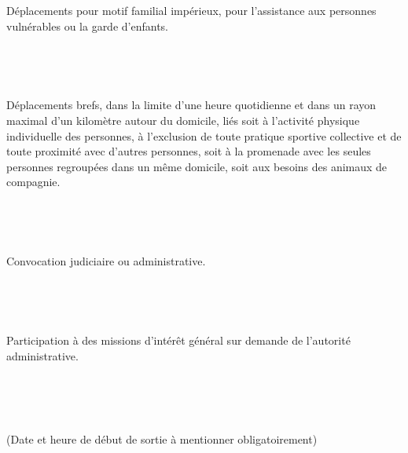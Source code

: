 \documentclass[a4paper,pagesize=pdftex,DIV=16]{scrartcl}
\newlength\TextFieldLength
\newcommand\TextFieldFill[2][]{%
	\setlength\TextFieldLength{\linewidth}%
	\settowidth{\dimen0}{#2 }%
	\addtolength\TextFieldLength{-\dimen0}%
	\addtolength\TextFieldLength{-2.22221pt}%
	\TextField[#1,width=\TextFieldLength]{\raisebox{2pt}{#2 }}%
}
\begin{document}
\begin{minipage}{0.94\textwidth} Déplacements pour motif familial impérieux, pour l’assistance aux personnes vulnérables ou la garde d’enfants.
\end{minipage}
\\[1.8ex]
\begin{minipage}{0.05\textwidth}
	\begin{Form}
		\CheckBox[backgroundcolor=gray!30,width=1.5em,bordercolor=black,height=1.5em]{\ \unskip}\ 
	\end{Form}
\end{minipage}
\begin{minipage}{0.94\textwidth} Déplacements brefs, dans la limite d'une heure quotidienne et dans un rayon maximal d'un kilomètre autour du domicile, liés soit à l'activité physique individuelle des personnes, à l'exclusion de toute pratique sportive collective et de toute proximité avec d'autres personnes, soit à la promenade avec les seules personnes regroupées dans un même domicile, soit aux besoins des animaux de compagnie.
\end{minipage}
\\[1.8ex]
\begin{minipage}{0.05\textwidth}
	\begin{Form}
		\CheckBox[backgroundcolor=gray!30,width=1.5em,bordercolor=black,height=1.5em]{\ \unskip}\ 
	\end{Form}
\end{minipage}
\begin{minipage}{0.94\textwidth} Convocation judiciaire ou administrative. 
\end{minipage}
\\[2.1ex]
\begin{minipage}{0.05\textwidth}
	\begin{Form}
		\CheckBox[backgroundcolor=gray!30,width=1.5em,bordercolor=black,height=1.5em]{\ \unskip}\ 
	\end{Form}
\end{minipage}
\begin{minipage}{0.94\textwidth} Participation à des missions d’intérêt général sur demande de l’autorité administrative.
\end{minipage}
\\[2ex]

\begin{Form}
	\TextFieldFill[backgroundcolor=gray!30,bordercolor=,height=1.4em]{Fait à : } \\[1.3ex]
	\TextField[backgroundcolor=gray!30,bordercolor=,width=3cm,height=1.4em]{Le : } \TextField[backgroundcolor=gray!30,bordercolor=,width=1cm,height=1.4em]{à}
	\TextField[backgroundcolor=gray!30,bordercolor=,width=1cm,height=1.4em]{h}\\
	(Date et heure de début de sortie à mentionner obligatoirement)
	 \\[1.5ex]
	\TextFieldFill[backgroundcolor=gray!30,bordercolor=,height=1.4em]{Signature : } \\
\end{Form}
\end{document}
